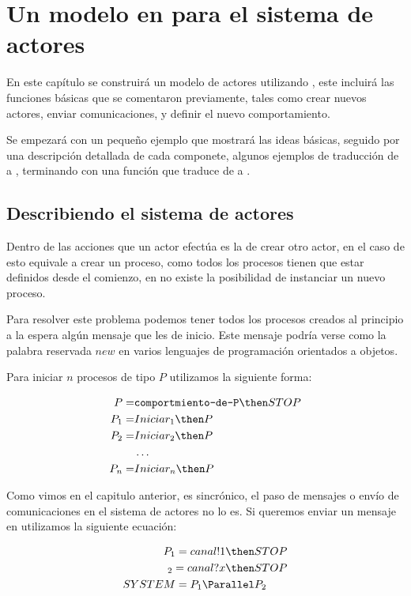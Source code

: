 \chapter{Un modelo en para el sistema de actores}
En este capítulo se construirá un modelo de actores utilizando \CSPm, este incluirá las funciones básicas que se comentaron previamente, tales como crear nuevos actores, enviar comunicaciones, y definir el nuevo comportamiento. 

Se empezará con un pequeño ejemplo que mostrará las ideas básicas, seguido por una descripción detallada de cada componete, algunos ejemplos de traducción de \SAL a \CSPm, terminando con una función que traduce de \SAL a \CSPm.

\section{Describiendo el sistema de actores} 
Dentro de las acciones que un actor efectúa es la de crear otro actor, en el caso de \CSP esto equivale a crear un proceso, como todos los procesos tienen que estar definidos desde el comienzo, en \CSP no existe la posibilidad de instanciar un nuevo proceso.

Para resolver este problema podemos tener todos los procesos creados al principio a la espera algún mensaje que les de inicio. Este mensaje podría verse como la palabra reservada $new$ en varios lenguajes de programación orientados a objetos. 

Para iniciar $n$ procesos de tipo $P$ utilizamos la siguiente forma:

\begin{align*}
P =& \texttt{comportmiento-de-P} \then STOP \\
P_1 =& Iniciar_1 \then P \\
P_2 =& Iniciar_2 \then P \\
&\ldots \\
P_n =& Iniciar_n \then P \\
\end{align*}

Como vimos en el capitulo anterior, \CSP es sincrónico, el paso de mensajes o envío de comunicaciones en el sistema de actores no lo es. Si queremos enviar un mensaje en \CSP utilizamos la siguiente ecuación:

\begin{align*}
P_1 = canal!1 \then& STOP \\
_2 = canal?x \then& STOP \\
SYSTEM = P_1 \Parallel& P_2 \\
\end{align*}

